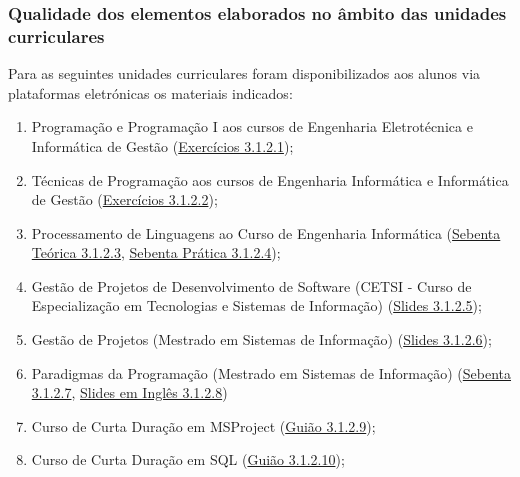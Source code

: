 \documentclass[11pt]{article}
\begin{document}
\subsubsection{Qualidade dos elementos elaborados no âmbito das unidades curriculares}
Para as seguintes unidades curriculares foram disponibilizados aos alunos via plataformas eletrónicas os materiais indicados: 
\begin{enumerate}
\item {Programação e Programação I aos cursos de Engenharia Eletrotécnica e Informática de Gestão (\href{run:Disciplinas/Apontamentos/ApontamentosAvaliacao/ProgI/exercicios.pdf}{Exercícios 3.1.2.1});}
\item {Técnicas de Programação aos cursos de Engenharia Informática e Informática de Gestão (\href{run:Disciplinas/Apontamentos/ApontamentosAvaliacao/TP/exerciciosTP.pdf}{Exercícios 3.1.2.2});}
\item {Processamento de Linguagens ao Curso de Engenharia Informática (\href{run:Disciplinas/Apontamentos/ApontamentosAvaliacao/ProcessamentoLinguagens/pling06TEO.pdf}{Sebenta Teórica 3.1.2.3}, \href{run:Disciplinas/Apontamentos/ApontamentosAvaliacao/ProcessamentoLinguagens/plingprof06.pdf}{Sebenta Prática 3.1.2.4});}
\item {Gestão de Projetos de Desenvolvimento de Software (CETSI - Curso de Especialização em Tecnologias e Sistemas de Informação) (\href{run:Disciplinas/Apontamentos/ApontamentosAvaliacao/GPCETSI/acetatosGPSW.pdf}{Slides 3.1.2.5});}
\item {Gestão de Projetos (Mestrado em Sistemas de Informação) (\href{run:Disciplinas/Apontamentos/acetatosGP.pdf}{Slides 3.1.2.6});}
\item {Paradigmas da Programação (Mestrado em Sistemas de Informação) (\href{run:Disciplinas/Apontamentos/PPSebenta2015.pdf}{Sebenta 3.1.2.7}, \href{run:Disciplinas/Apontamentos/PPingles.pdf}{Slides em Inglês 3.1.2.8})}
\item {Curso de Curta Duração em MSProject (\href{run:Disciplinas/Apontamentos/MSProject2010.pdf}{Guião 3.1.2.9});}
\item {Curso de Curta Duração em SQL (\href{run:Disciplinas/Apontamentos/ApontamentosAvaliacao/CursoSQLZamora/SQLPlus.pdf}{Guião 3.1.2.10});}
\end{enumerate}
\end{document}
